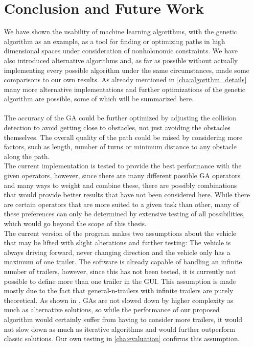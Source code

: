 \chapter{Conclusion and Future Work}
\label{cha:conclusion}

We have shown the usability of machine learning algorithms, with the genetic algorithm as an example, as a tool for finding or optimizing paths in high dimensional spaces under consideration of nonholonomic constraints. We have also introduced alternative algorithms and, as far as possible without actually implementing every possible algorithm under the same circumstances, made some comparisons to our own results. 
As already mentioned in \ref{cha:algorithm_details} many more alternative implementations and further optimizations of the genetic algorithm are possible, some of which will be summarized here.\\
\\
The accuracy of the GA could be further optimized by adjusting the collision detection to avoid getting close to obstacles, not just avoiding the obstacles themselves. The overall quality of the path could be raised by considering more factors, such as length, number of turns or minimum distance to any obstacle along the path.\\
The current implementation is tested to provide the best performance with the given operators, however, since there are many different possible GA operators and many ways to weight and combine these, there are possibly combinations that would provide better results that have not been considered here. While there are certain operators that are more suited to a given task than other, many of these preferences can only be determined by extensive testing of all possibilities, which would go beyond the scope of this thesis.\\
The current version of the program makes two assumptions about the vehicle that may be lifted with slight alterations and further testing: The vehicle is always driving forward, never changing direction and the vehicle only has a maximum of one trailer. The software is already capable of handling an infinite number of trailers, however, since this has not been tested, it is currently not possible to define more than one trailer in the GUI. This assumption is made mostly due to the fact that general-n-trailers with infinite trailers are purely theoretical. As shown in \cite{8}, GAs are not slowed down by higher complexity as much as alternative solutions, so while the performance of our proposed algorithm would certainly suffer from having to consider more trailers, it would not slow down as much as iterative algorithms and would further outperform classic solutions. Our own testing in \ref{cha:evaluation} confirms this assumption.\\
